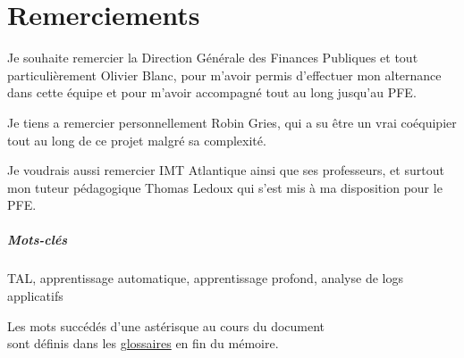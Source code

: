 \documentclass[openany, 11pt]{memoir}
\newcommand\chapters[1]{
	\chapter*{#1}
	\addcontentsline{toc}{chapter}{#1}
}
\begin{document}
\newpage
{}
\tableofcontents
{}

\newpage
\chapters{Remerciements}
Je souhaite remercier la Direction Générale des Finances Publiques et tout particulièrement Olivier Blanc, pour m'avoir permis d'effectuer mon alternance dans cette équipe et pour m'avoir accompagné tout au long jusqu'au PFE.

\bigskip
Je tiens a remercier personnellement Robin Gries, qui a su être un vrai coéquipier tout au long de ce projet malgré sa complexité.

\bigskip
Je voudrais aussi remercier IMT Atlantique ainsi que ses professeurs, et surtout mon tuteur pédagogique Thomas Ledoux qui s'est mis à ma disposition pour le PFE.

\newpage
\begin{abstract}
Les \glspl{log} sont une source importante de données détaillant le fonctionnement interne d'une application, mais ne sont pourtant que rarement utilisés a leur plein potentiel. Dans ce mémoire, je vais détailler le processus d'évolution d'un outil d'\gls{ml} qui utilise les logs pour détecter et même tenter de prévoir des anomalies logicielles. Un état de l'art des méthodes d'analyse de logs existante a été compilé, ainsi qu'une analyse des fichiers de logs disponibles. Ensuite, une implémentation des algorithmes a été faite à l'aide d'une réécriture de l'architecture du projet.
\end{abstract}

{ 
\begin{abstract}
\Glspl{log} are an important source of data when it comes to the internal workings of software, but they are rarely used to their full potential. In this memoir, I will explain the evolution of a machine learning tool which uses \glspl{log} to detect and even attempt to predict software anomalies. A state of the art of existing log analysis methods was compiled, as well as an analysis of available log files. Then, an implementation of the algorithms was made using a rewritten project architecture.
\end{abstract}}

\paragraph{Mots-clés}
\gls{TAL}, apprentissage automatique, apprentissage profond, analyse de logs applicatifs

\newpage
\begin{center}
	\vspace*{\fill}
	Les mots succédés d'une astérisque au cours du document\\
	sont définis dans les \hyperref[glos]{glossaires} en fin du mémoire.
    \vspace*{\fill}
\end{center}
\end{document}
